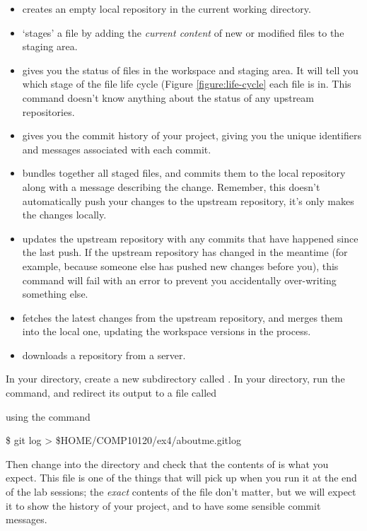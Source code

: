 \begin{itemize}
\item {} creates an empty local repository in the current working directory. 
\item {} `stages' a file by adding the \emph{current content} of new or modified files to the staging area. 
\item {} gives you the status of files in the workspace and staging area. It will tell you which stage of the file life cycle (Figure \ref{figure:life-cycle} each file is in. This command doesn't know anything about the status of any upstream repositories.
\item {} gives you the commit history of your project, giving you the unique identifiers and messages associated with each commit.
\item {} bundles together all staged files, and commits them to the local repository along with a message describing the change. Remember, this doesn't automatically push your changes to the upstream repository, it's only makes the changes locally. 
\item {} updates the upstream repository with any commits that have happened since the last push. If the upstream repository has changed in the meantime (for example, because someone else has pushed new changes before you), this command will fail with an error to prevent you accidentally over-writing something else.
\item {} fetches the latest changes from the upstream repository, and merges them into the local one, updating the workspace versions in the process.
\item {} downloads a repository from a server.  
\end{itemize}



In your  directory, create a new subdirectory called . In your  directory, run the  command, and redirect its output to a file called
\begin{ttoutenv}
\end{ttoutenv}
 using the command  
\begin{ttoutenv}
\$ git log > \$HOME/COMP10120/ex4/aboutme.gitlog
\end{ttoutenv}

Then change into the  directory and check that the contents of  is what you expect. This file is one of the things that  will pick up when you run it at the end of the lab sessions; the \emph{exact} contents of the file don't matter, but we will expect it to show the history of your  project, and to have some sensible commit messages. 

